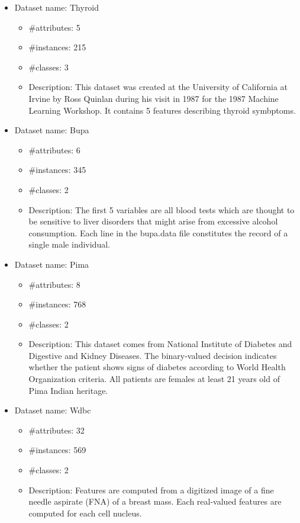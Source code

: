 \begin{itemize}
    \item Dataset name: Thyroid
        \begin{itemize}
            \item \#attributes: 5
            \item \#instances: 215
            \item \#classes: 3
            \item Description:
                This dataset was created at the University of
                California at Irvine by Ross Quinlan during his visit in 1987 for
                the 1987 Machine Learning Workshop. It contains 5 features
                describing thyroid symbptoms.
        \end{itemize}

    \item Dataset name: Bupa
        \begin{itemize}
            \item \#attributes: 6
            \item \#instances: 345
            \item \#classes: 2
            \item Description:
                The first 5 variables are all blood tests which are thought to
                be sensitive to liver disorders that might arise from excessive 
                alcohol consumption. Each line in the bupa.data file constitutes
                the record of a single male individual. 
        \end{itemize}

    \item Dataset name: Pima
        \begin{itemize}
            \item \#attributes: 8
            \item \#instances: 768
            \item \#classes: 2
            \item Description:
                This dataset comes from National Institute of Diabetes and Digestive and
                Kidney Diseases. The binary-valued decision indicates whether the
                patient shows signs of diabetes according to World Health Organization
                criteria. All patients are females at least 21 years old of Pima Indian heritage.
        \end{itemize}

    \item Dataset name: Wdbc
        \begin{itemize}
            \item \#attributes: 32
            \item \#instances: 569
            \item \#classes: 2
            \item Description:
                Features are computed from a digitized image of a fine needle aspirate (FNA) of a breast mass.
                Each real-valued features are computed for each cell nucleus.
        \end{itemize}
\end{itemize}
